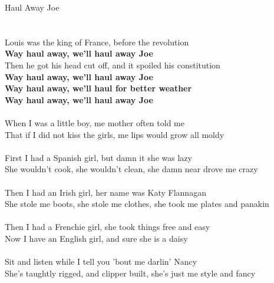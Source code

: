 \documentclass[letterpaper,9pt]{article}
\begin{document}
\newpage
{}
\huge
Haul Away Joe\\
\\
\noindent
\\Louis was the king of France, before the revolution
\\\textbf{Way haul away, we'll haul away Joe}
\\Then he got his head cut off, and it spoiled his constitution
\\\textbf{Way haul away, we'll haul away Joe
\\Way haul away, we'll haul for better weather
\\Way haul away, we'll haul away Joe}
\\
\\When I was a little boy, me mother often told me
\\That if I did not kiss the girls, me lips would grow all moldy
\\
\\First I had a Spanish girl, but damn it she was lazy
\\She wouldn't cook, she wouldn't clean, she damn near drove me crazy
\\
\\Then I had an Irish girl, her name was Katy Flannagan
\\She stole me boots, she stole me clothes, she took me plates and panakin
\\
\\Then I had a Frenchie girl, she took things free and easy
\\Now I have an English girl, and sure she is a daisy
\\
\\Sit and listen while I tell you 'bout me darlin' Nancy
\\She's taughtly rigged, and clipper built, she's just me style and fancy
\end{document}
